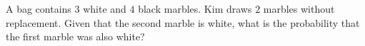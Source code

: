 A bag contains $3$ white and $4$ black marbles. Kim draws $2$ marbles without replacement. Given that the second marble is white, what is the probability that the first marble was also white?
